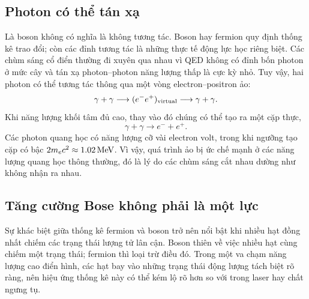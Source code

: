 \subsection{Photon có thể tán xạ}

Là boson không có nghĩa là không tương tác. Boson hay fermion quy định thống kê trao đổi; còn các đỉnh tương tác là những thực tế động lực học riêng biệt. Các chùm sáng cổ điển thường đi xuyên qua nhau vì QED không có đỉnh bốn photon ở mức cây và tán xạ photon--photon năng lượng thấp là cực kỳ nhỏ. Tuy vậy, hai photon có thể tương tác thông qua một vòng electron--positron ảo:
\begin{equation}
  \gamma+\gamma
  \longrightarrow(e^-e^+)_{\rm virtual}
  \longrightarrow\gamma+\gamma.
\end{equation}
Khi năng lượng khối tâm đủ cao, thay vào đó chúng có thể tạo ra một cặp thực,
\begin{equation}
  \gamma+\gamma\longrightarrow e^-+e^+.
\end{equation}
Các photon quang học có năng lượng cỡ vài electron volt, trong khi ngưỡng tạo cặp có bậc \(2m_e c^2\approx1.02\,{\rm MeV}\). Vì vậy, quá trình ảo bị ức chế mạnh ở các năng lượng quang học thông thường, đó là lý do các chùm sáng cắt nhau dường như không nhận ra nhau.

\begin{classroomqa}
\end{classroomqa}

\subsection{Tăng cường Bose không phải là một lực}

Sự khác biệt giữa thống kê fermion và boson trở nên nổi bật khi nhiều hạt đồng nhất chiếm các trạng thái lượng tử lân cận. Boson thiên về việc nhiều hạt cùng chiếm một trạng thái; fermion thì loại trừ điều đó. Trong một va chạm năng lượng cao điển hình, các hạt bay vào những trạng thái động lượng tách biệt rõ ràng, nên hiệu ứng thống kê này có thể kém lộ rõ hơn so với trong laser hay chất ngưng tụ.

